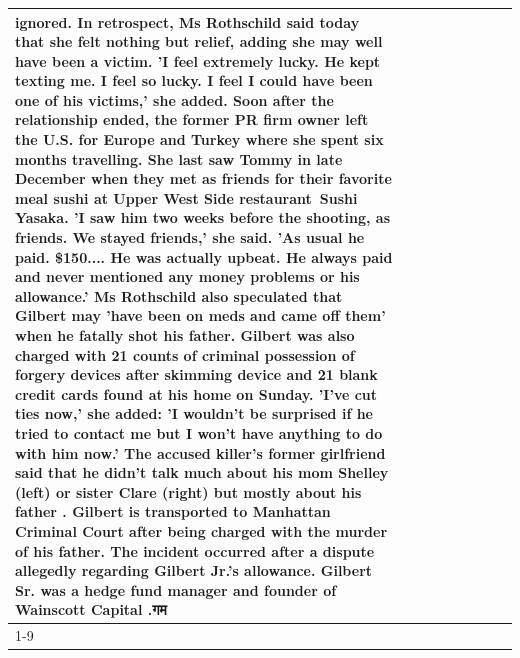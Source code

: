 \begin{table}[H]
\begin{tabular}{lllrlllll}
ignored. In retrospect, Ms Rothschild said today that she felt nothing but relief, adding she may well have been a victim. 'I feel extremely lucky. He kept texting me. I feel so lucky. I feel I could have been one of his victims,' she added. Soon after the relationship ended, the former PR firm owner left the U.S. for Europe and Turkey where she spent six months  travelling. She last saw Tommy in late December when they met as friends for their favorite meal sushi at Upper West Side restaurant Sushi Yasaka. 'I saw him two weeks before the shooting, as friends. We stayed friends,' she said. 'As usual he paid. \$150.... He was actually upbeat. He always paid and never mentioned any money problems or his allowance.' Ms Rothschild also speculated that Gilbert may 'have been on meds and came off them' when he fatally shot his father. Gilbert was also charged with 21 counts of criminal possession of forgery devices after skimming device and 21 blank credit cards found at his home on Sunday. 'I've cut ties now,' she added: 'I wouldn’t be surprised if he tried to contact me but I won’t have anything to do with him now.' The accused killer's former girlfriend said that he didn't talk much about his mom Shelley (left) or sister Clare (right) but mostly about his father . Gilbert is transported to Manhattan Criminal Court  after being charged with the murder of his father. The incident occurred after a dispute allegedly regarding Gilbert Jr.'s allowance. Gilbert Sr. was a hedge fund manager and founder of Wainscott Capital .गम \\
\cline{1-9}

\end{tabular}
\end{table}
